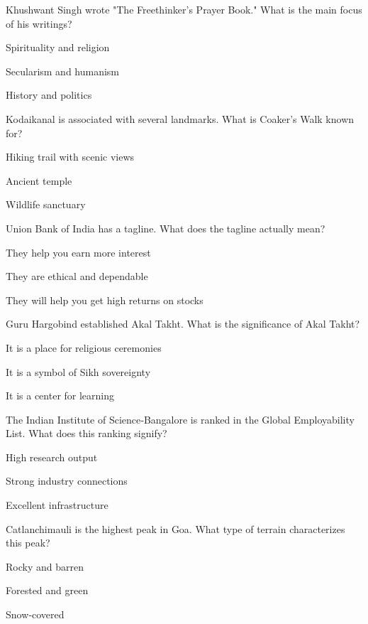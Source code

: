 \begin{enhancedmcq}{Khushwant Singh wrote "The Freethinker's Prayer Book." What is the main focus of his writings?}
\item Spirituality and religion
\item Secularism and humanism
\item History and politics

\end{enhancedmcq}
\begin{enhancedmcq}{Kodaikanal is associated with several landmarks. What is Coaker's Walk known for?}
\item Hiking trail with scenic views
\item Ancient temple
\item Wildlife sanctuary

\end{enhancedmcq}
\begin{enhancedmcq}{Union Bank of India has a tagline. What does the tagline actually mean?}
\item They help you earn more interest
\item They are ethical and dependable
\item They will help you get high returns on stocks

\end{enhancedmcq}
\begin{enhancedmcq}{Guru Hargobind established Akal Takht. What is the significance of Akal Takht?}
\item It is a place for religious ceremonies
\item It is a symbol of Sikh sovereignty
\item It is a center for learning

\end{enhancedmcq}
\begin{enhancedmcq}{The Indian Institute of Science‑Bangalore is ranked in the Global Employability List. What does this ranking signify?}
\item High research output
\item Strong industry connections
\item Excellent infrastructure

\end{enhancedmcq}
\begin{enhancedmcq}{Catlanchimauli is the highest peak in Goa. What type of terrain characterizes this peak?}
\item Rocky and barren
\item Forested and green
\item Snow‑covered

\end{enhancedmcq}
